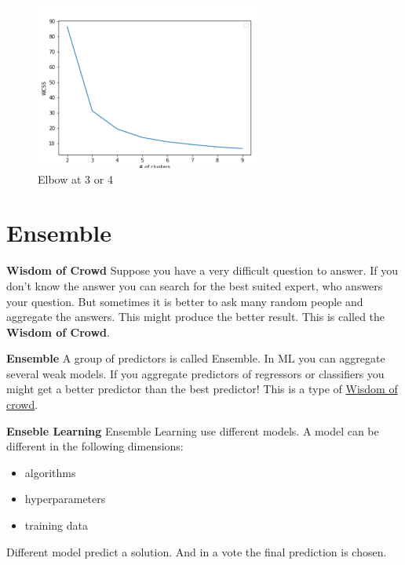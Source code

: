 \documentclass[11pt,twoside,landscape]{article}
\begin{document}
\begin{multicols}{3}
\begin{figure}[htbp]
\centering
\includegraphics[width=.9\linewidth]{img/elbow_method.png}
\caption{Elbow at 3 or 4}
\end{figure}

\section{Ensemble}
\label{sec:org1e1ae28}
\textbf{Wisdom of Crowd}
Suppose you have a very difficult question to answer.
If you don't know the answer you can search for the best suited expert, who answers your question.
But sometimes it is better to ask many random people and aggregate the answers.
This might produce the better result.
This is called the \textbf{Wisdom of Crowd}.

\textbf{Ensemble}
A group of predictors is called Ensemble.
In ML you can aggregate several weak models.
If you aggregate predictors of regressors or classifiers you might get a better predictor than the best predictor!
This is a type of \href{../../../roam/20211228083830-wisdom_of_crowd.org}{Wisdom of crowd}.

\textbf{Enseble Learning}
Ensemble Learning use different models.
A model can be different in the following dimensions:
\begin{itemize}
\item algorithms
\item hyperparameters
\item training data
\end{itemize}


Different model predict a solution.
And in a vote the final prediction is chosen.


\end{multicols}
\end{document}
